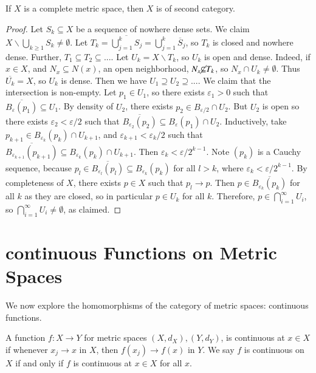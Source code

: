 \begin{namthm}
    If $X$ is a complete metric space, then $X$ is of second category.
\end{namthm}
\begin{proof}
    Let $S_k \subseteq X$ be a sequence of nowhere dense sets. We claim $X \backslash \bigcup_{k\geq 1}S_k \neq \emptyset$. Let $T_k = \overline{\bigcup_{j=1}^kS_j} = \bigcup_{j=1}^k\overline{S}_j$, so $T_k$ is closed and nowhere dense. Further, $T_1 \subseteq T_2 \subseteq ...$. Let $U_k = X\backslash T_k$, so $U_k$ is open and dense. Indeed, if $x \in X$, and $N_x \subseteq N(x)$, an open neighborhood, $N_x \cancel{\subseteq}T_k$, so $N_x\cap U_k \neq \emptyset$. Thus $\overline{U_k} = X$, so $U_k$ is dense. Then we have $U_1 \supseteq U_2 \supseteq ...$. We claim that the intersection is non-empty. Let $p_1 \in U_1$, so there exists $\varepsilon_1 > 0$ such that $\overline{B_{\varepsilon}(p_1)} \subseteq U_1$. By density of $U_2$, there exists $p_2 \in B_{\varepsilon/2}\cap U_2$. But $U_2$ is open so there exists $\varepsilon_2 < \varepsilon/2$ such that $\overline{B_{\varepsilon_2}(p_2)} \subseteq B_{\varepsilon}(p_1)\cap U_2$. Inductively, take $p_{k+1} \in B_{\varepsilon_k}(p_k) \cap U_{k+1}$, and $\varepsilon_{k+1} < \varepsilon_k/2$ such that $\overline{B_{\varepsilon_{k+1}}(p_{k+1})} \subseteq B_{\varepsilon_k}(p_k) \cap U_{k+1}$. Then $\varepsilon_k < \varepsilon/2^{k-1}$. Note $(p_k)$ is a Cauchy sequence, because $p_l \in \overline{B_{\varepsilon_l}(p_l)} \subseteq B_{\varepsilon_k}(p_k)$ for all $l > k$, where $\varepsilon_k < \varepsilon/2^{k-1}$. By completeness of $X$, there exists $p \in X$ such that $p_l \rightarrow p$. Then $p \in \overline{B_{\varepsilon_k}(p_k)}$ for all $k$ as they are closed, so in particular $p \in U_k$ for all $k$. Therefore, $p \in \bigcap_{i=1}^{\infty}U_i$, so $\bigcap_{i=1}^{\infty}U_i\neq \emptyset$, as claimed.
\end{proof}

\section{continuous Functions on Metric Spaces}


We now explore the homomorphisms of the category of metric spaces: continuous functions.

\begin{defn}
    A function $f:X\rightarrow Y$ for metric spaces $(X,d_X), (Y,d_Y)$, is continuous at $x \in X$ if whenever $x_j \rightarrow x$ in $X$, then $f(x_j)\rightarrow f(x)$ in $Y$. We say $f$ is continuous on $X$ if and only if $f$ is continuous at $x \in X$ for all $x$.
\end{defn}

